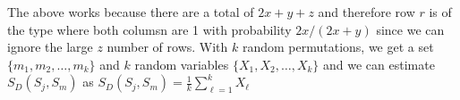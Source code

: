 \documentclass[11pt]{article}
\begin{document}
The above works because there are a total of $2x + y + z$ and therefore row $r$ is of the type where both columsn are 1 with probability $2x/(2x + y)$ since we can ignore the large $z$ number of rows. With $k$ random permutations, we get a set $\{m_{1}, m_{2}, \ldots, m_{k}\}$ and $k$ random variables $\{ X_{1}, X_{2}, \ldots, X_{k}\}$ and we can estimate $S_{D}(S_{j}, S_{m})$ as $S_{D}(S_{j}, S_{m}) = \frac{1}{k}\sum_{\ell = 1}^{k}X_{\ell}$
\end{document}
